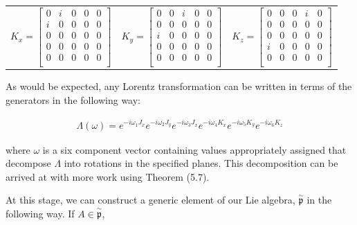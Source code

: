 \documentclass[10pt]{ucthesis}
\begin{document}
\begin{center}
\begin{tabular}{ccc}
	$K_x = \begin{bmatrix}
				0 & i & 0 & 0 & 0 \\
				i & 0 & 0 & 0 & 0\\
				0 & 0 & 0 & 0 & 0\\
				0 & 0 & 0 & 0 & 0\\
				0 & 0 & 0 & 0 & 0\\
			\end{bmatrix}$ &
	$K_y = \begin{bmatrix}
				0 & 0 & i & 0 & 0 \\
				0 & 0 & 0 & 0 & 0\\
				i & 0 & 0 & 0 & 0\\
				0 & 0 & 0 & 0 & 0\\
				0 & 0 & 0 & 0 & 0\\
			\end{bmatrix}$ &
	$K_z = \begin{bmatrix}
				0 & 0 & 0 & i & 0 \\
				0 & 0 & 0 & 0 & 0\\
				0 & 0 & 0 & 0 & 0\\
				i & 0 & 0 & 0 & 0\\
				0 & 0 & 0 & 0 & 0\\
			\end{bmatrix}$ 
\end{tabular}
\end{center}

As would be expected, any Lorentz transformation can be written in terms of the generators in the following way:

\begin{equation}
\begin{aligned}
	\Lambda (\omega) = e^{-i\omega_1J_x}e^{-i\omega_2J_y}e^{-i\omega_3J_x}e^{-i\omega_4K_x}e^{-i\omega_5K_y}e^{-i\omega_6K_z}
\end{aligned}
\end{equation}

\noindent where $\omega$ is a six component vector containing values appropriately assigned that decompose $\Lambda$ into rotations in the specified planes. This decomposition can be arrived at with more work using Theorem (5.7). 

At this stage, we can construct a generic element of our Lie algebra, $\mathfrak{\overset{\sim}{p}}$ in the following way. If $A\in\mathfrak{\overset{\sim}{p}}$, 
\end{document}

